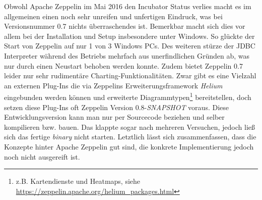 Obwohl Apache Zeppelin im Mai 2016 den Incubator Status verlies macht es im allgemeinen einen noch sehr unreifen und unfertigen Eindruck, was bei Versionsnummer 0.7 nichts überraschendes ist. Bemerkbar macht sich dies vor allem bei der Installation und Setup insbesondere unter Windows. So glückte der Start von Zeppelin auf nur 1 von 3 Windows PCs. Des weiteren stürze der JDBC Interpreter während des Betriebs mehrfach aus unerfindlichen Gründen ab, was nur durch einen Neustart behoben werden konnte. Zudem bietet Zeppelin 0.7 leider nur sehr rudimentäre Charting-Funktionalitäten. Zwar gibt es eine Vielzahl an externen Plug-Ins die via Zeppelins Erweiterungsframework \textit{Helium} eingebunden werden können und erweiterte Diagrammtypen\footnote{z.B. Kartendienste und  Heatmaps, siehe \href{https://zeppelin.apache.org/helium_packages.html}{https://zeppelin.apache.org/helium\_packages.html} } bereitstellen, doch setzen diese Plug-Ins oft Zeppelin Version 0.8-\textit{SNAPSHOT} voraus. Diese Entwicklungsversion kann man nur per Sourcecode beziehen und selber kompilieren bzw. bauen. Das klappte sogar nach mehreren Versuchen, jedoch ließ sich das fertige \textit{binary} nicht starten.\newline
Letztlich lässt sich zusammenfassen, dass die Konzepte hinter Apache Zeppelin gut sind, die konkrete Implementierung jedoch noch nicht ausgereift ist.